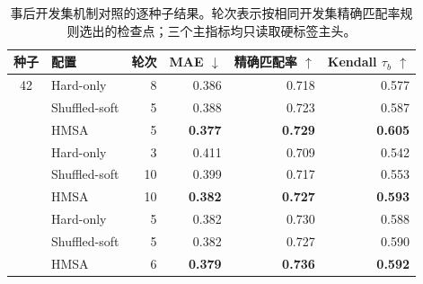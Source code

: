 \begin{table}[H]
\centering
\caption{事后开发集机制对照的逐种子结果。轮次表示按相同开发集精确匹配率规则选出的检查点；三个主指标均只读取硬标签主头。}
\label{tab:dev_mechanism_by_seed}
\small
\begin{tabular}{clrrrr}
\toprule
种子 & 配置 & 轮次 & MAE $\downarrow$ & 精确匹配率 $\uparrow$ & Kendall $\tau_b$ $\uparrow$ \\
\midrule
42 & Hard-only & 8 & 0.386 & 0.718 & 0.577 \\
 & Shuffled-soft & 5 & 0.388 & 0.723 & 0.587 \\
 & HMSA & 5 & \textbf{0.377} & \textbf{0.729} & \textbf{0.605} \\
\addlinespace[2pt]
43 & Hard-only & 3 & 0.411 & 0.709 & 0.542 \\
 & Shuffled-soft & 10 & 0.399 & 0.717 & 0.553 \\
 & HMSA & 10 & \textbf{0.382} & \textbf{0.727} & \textbf{0.593} \\
\addlinespace[2pt]
44 & Hard-only & 5 & 0.382 & 0.730 & 0.588 \\
 & Shuffled-soft & 5 & 0.382 & 0.727 & 0.590 \\
 & HMSA & 6 & \textbf{0.379} & \textbf{0.736} & \textbf{0.592} \\
\bottomrule
\end{tabular}
\end{table}
